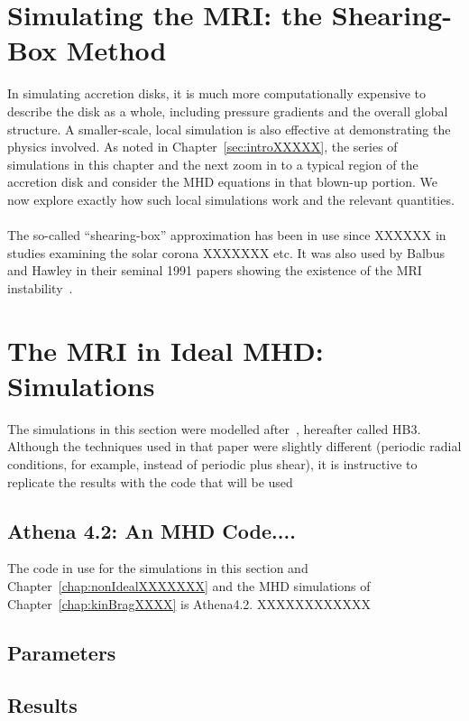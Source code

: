 \section{Simulating the MRI: the Shearing-Box Method} \label{sec:mrisbideal}
In simulating accretion disks, it is much more computationally expensive to describe the disk as a whole, including pressure gradients and the overall global structure. A smaller-scale, local simulation is also effective at demonstrating the physics involved. As noted in Chapter~\ref{sec:introXXXXX}, the series of simulations in this chapter and the next zoom in to a typical region of the accretion disk and consider the MHD equations in that blown-up portion. We now explore exactly how such local simulations work and the relevant quantities.\\
\\
The so-called ``shearing-box'' approximation has been in use since XXXXXX in studies examining the solar corona XXXXXXX etc. It was also used by Balbus and Hawley in their seminal 1991 papers showing the existence of the MRI instability~\cite{BH1991a, BH1991b, BH1991c}. 


\section{The MRI in Ideal MHD: Simulations} \label{sec:mrisimideal}
The simulations in this section were modelled after~\cite{XXXXXXBH1991c}, hereafter called HB3. Although the techniques used in that paper were slightly different (periodic radial conditions, for example, instead of periodic plus shear), it is instructive to replicate the results with the code that will be used

\subsection{Athena 4.2: An MHD Code....}
The code in use for the simulations in this section and Chapter~\ref{chap:nonIdealXXXXXXX} and the MHD simulations of Chapter~\ref{chap:kinBragXXXX} is Athena4.2. XXXXXXXXXXXX

\subsection{Parameters}

\subsection{Results}

